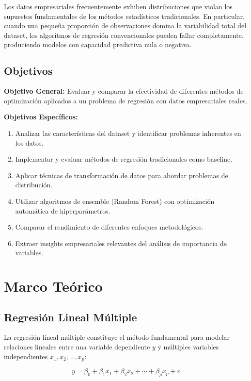 \documentclass[12pt,a4paper]{article}
\begin{document}
Los datos empresariales frecuentemente exhiben distribuciones que violan los supuestos fundamentales de los métodos estadísticos tradicionales. En particular, cuando una pequeña proporción de observaciones domina la variabilidad total del dataset, los algoritmos de regresión convencionales pueden fallar completamente, produciendo modelos con capacidad predictiva nula o negativa.

\subsection{Objetivos}

\textbf{Objetivo General:}
Evaluar y comparar la efectividad de diferentes métodos de optimización aplicados a un problema de regresión con datos empresariales reales.

\textbf{Objetivos Específicos:}
\begin{enumerate}
    \item Analizar las características del dataset y identificar problemas inherentes en los datos.
    \item Implementar y evaluar métodos de regresión tradicionales como baseline.
    \item Aplicar técnicas de transformación de datos para abordar problemas de distribución.
    \item Utilizar algoritmos de ensemble (Random Forest) con optimización automática de hiperparámetros.
    \item Comparar el rendimiento de diferentes enfoques metodológicos.
    \item Extraer insights empresariales relevantes del análisis de importancia de variables.
\end{enumerate}

\section{Marco Teórico}

\subsection{Regresión Lineal Múltiple}

La regresión lineal múltiple constituye el método fundamental para modelar relaciones lineales entre una variable dependiente $y$ y múltiples variables independientes $x_1, x_2, \ldots, x_p$:

\begin{equation}
y = \beta_0 + \beta_1 x_1 + \beta_2 x_2 + \cdots + \beta_p x_p + \varepsilon
\end{equation}
\end{document}
